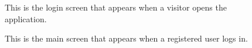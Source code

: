 \documentclass[12pt,titlepage]{article}
\begin{document}
\begin{figure}
\caption{This is the login screen that appears when a visitor opens the application.}
\end{figure}
\clearpage
\newpage

\begin{figure}
\centering
{}
\caption{This is the main screen that appears when a registered user logs in.}
\end{figure}
\clearpage
\newpage
\end{document}
